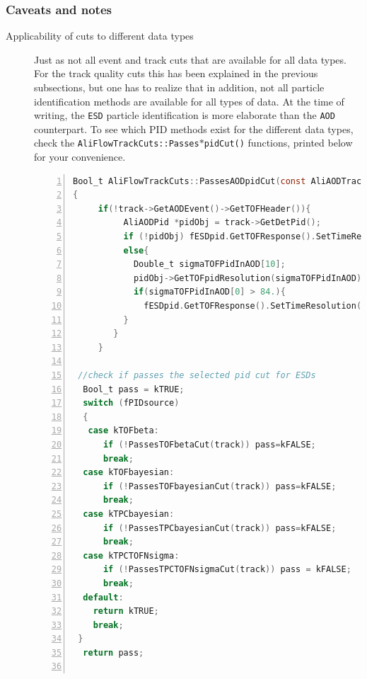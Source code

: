 \documentclass[a4paper]{book}
\numberwithin{equation}{subsection}
\begin{document}
\subsubsection{Caveats and notes}
\begin{description}
\item[Applicability of cuts to different data types] Just as not all event and track cuts that are available for all data types. For the track quality cuts this has been explained in the previous subsections, but one has to realize that in addition, not all particle identification methods are available for all types of data. At the time of writing, the \texttt{ESD} particle identification is more elaborate than the \texttt{AOD} counterpart. To see which PID methods exist for the different data types, check the \texttt{AliFlowTrackCuts::Passes$\ast$pidCut()} functions,  printed below for your convenience.

\begin{lstlisting}[language=C, numbers=left]
Bool_t AliFlowTrackCuts::PassesAODpidCut(const AliAODTrack* track )
{
     if(!track->GetAODEvent()->GetTOFHeader()){
          AliAODPid *pidObj = track->GetDetPid();
          if (!pidObj) fESDpid.GetTOFResponse().SetTimeResolution(84.);
          else{
            Double_t sigmaTOFPidInAOD[10];
            pidObj->GetTOFpidResolution(sigmaTOFPidInAOD);
            if(sigmaTOFPidInAOD[0] > 84.){
              fESDpid.GetTOFResponse().SetTimeResolution(sigmaTOFPidInAOD[0]); // use the electron TOF PID sigma as time resolution (including the T0 used)
          }
        }
     }

 //check if passes the selected pid cut for ESDs
  Bool_t pass = kTRUE;
  switch (fPIDsource)
  {
   case kTOFbeta:
      if (!PassesTOFbetaCut(track)) pass=kFALSE;
      break;
  case kTOFbayesian:
      if (!PassesTOFbayesianCut(track)) pass=kFALSE;
      break;
  case kTPCbayesian:
      if (!PassesTPCbayesianCut(track)) pass=kFALSE;
      break;
  case kTPCTOFNsigma:
      if (!PassesTPCTOFNsigmaCut(track)) pass = kFALSE;
      break;
  default:
    return kTRUE;
    break;
 }
  return pass;


\end{lstlisting}
\end{description}
\end{document}
